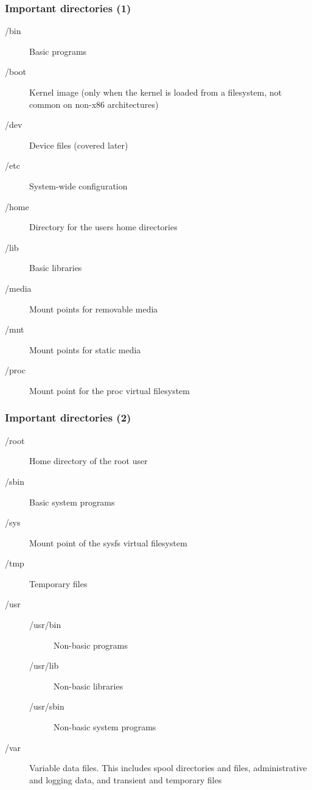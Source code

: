 \begin{frame}
  \frametitle{Important directories (1)}
  \begin{description}
  \item[/bin] Basic programs
  \item[/boot] Kernel image (only when the kernel is loaded from a
    filesystem, not common on non-x86 architectures)
  \item[/dev] Device files (covered later)
  \item[/etc] System-wide configuration
  \item[/home] Directory for the users home directories
  \item[/lib] Basic libraries
  \item[/media] Mount points for removable media
  \item[/mnt] Mount points for static media
  \item[/proc] Mount point for the proc virtual filesystem
  \end{description}
\end{frame}

\begin{frame}
  \frametitle{Important directories (2)}
  \begin{description}
  \item[/root]Home directory of the root user
  \item[/sbin]Basic system programs
  \item[/sys]Mount point of the sysfs virtual filesystem
  \item[/tmp]Temporary files
  \item[/usr]
    \begin{description}
    \item[/usr/bin]Non-basic programs
    \item[/usr/lib]Non-basic libraries
    \item[/usr/sbin]Non-basic system programs
    \end{description}
  \item[/var] Variable data files. This includes spool directories and
    files, administrative and logging data, and transient and
    temporary files
  \end{description}
\end{frame}

